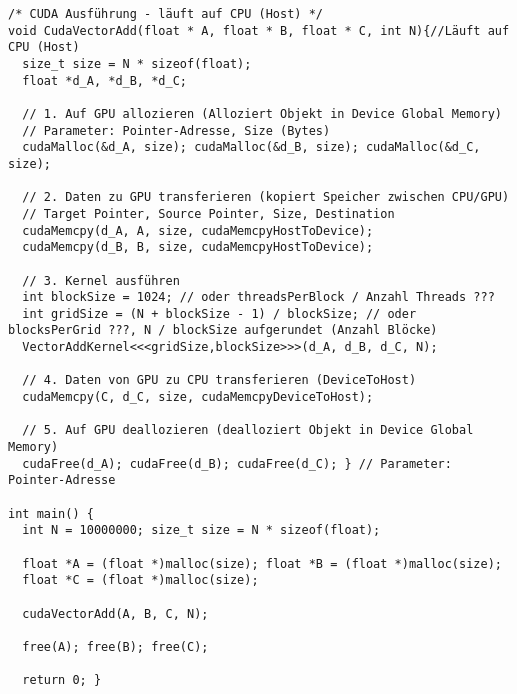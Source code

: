 \begin{lstlisting}
/* CUDA Ausführung - läuft auf CPU (Host) */
void CudaVectorAdd(float * A, float * B, float * C, int N){//Läuft auf CPU (Host)
  size_t size = N * sizeof(float);
  float *d_A, *d_B, *d_C;

  // 1. Auf GPU allozieren (Alloziert Objekt in Device Global Memory)
  // Parameter: Pointer-Adresse, Size (Bytes)
  cudaMalloc(&d_A, size); cudaMalloc(&d_B, size); cudaMalloc(&d_C, size);

  // 2. Daten zu GPU transferieren (kopiert Speicher zwischen CPU/GPU)
  // Target Pointer, Source Pointer, Size, Destination
  cudaMemcpy(d_A, A, size, cudaMemcpyHostToDevice);
  cudaMemcpy(d_B, B, size, cudaMemcpyHostToDevice);

  // 3. Kernel ausführen
  int blockSize = 1024; // oder threadsPerBlock / Anzahl Threads ???
  int gridSize = (N + blockSize - 1) / blockSize; // oder blocksPerGrid ???, N / blockSize aufgerundet (Anzahl Blöcke)
  VectorAddKernel<<<gridSize,blockSize>>>(d_A, d_B, d_C, N);

  // 4. Daten von GPU zu CPU transferieren (DeviceToHost)
  cudaMemcpy(C, d_C, size, cudaMemcpyDeviceToHost);

  // 5. Auf GPU deallozieren (dealloziert Objekt in Device Global Memory)
  cudaFree(d_A); cudaFree(d_B); cudaFree(d_C); } // Parameter: Pointer-Adresse

int main() {
  int N = 10000000; size_t size = N * sizeof(float);

  float *A = (float *)malloc(size); float *B = (float *)malloc(size);
  float *C = (float *)malloc(size);

  cudaVectorAdd(A, B, C, N);

  free(A); free(B); free(C);

  return 0; }
\end{lstlisting}


